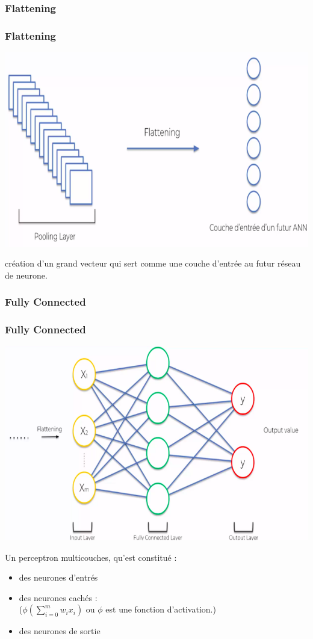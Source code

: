 \documentclass[11pt]{beamer}
\begin{document}
\subsubsection{Flattening}
\begin{frame}
\frametitle{Flattening}
\begin{center}
\includegraphics[scale=0.25]{img16.png}
\end{center}

création d'un grand vecteur qui sert comme une couche d’entrée au futur réseau de neurone.
\end{frame}
\subsubsection{Fully Connected}
\begin{frame}
\frametitle{Fully Connected}
\begin{center}
\includegraphics[scale=0.17]{img17.png}
\end{center}
Un perceptron multicouches, qu'est constitué :
\begin{itemize}
	\item des neurones d’entrés
	\item des neurones cachés :\\ ($\phi (\sum_{i=0}^{m} w_{i} x_{i})$ ou  $\phi$ est une fonction d’activation.)
	\item des neurones de sortie
\end{itemize}
\end{frame}
\end{document}
